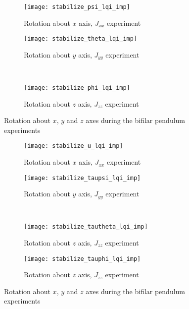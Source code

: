 \begin{appendices}
\begin{figure}[H]
\begin{subfigure}{.5\linewidth}
\centering
\texttt{[image: stabilize\_psi\_lqi\_imp]}
\caption{Rotation about $x$ axis, $J_{xx}$ experiment}
\label{fig:stabilize_psi_lqi_imp}
\end{subfigure}%
\begin{subfigure}{.5\linewidth}
\centering
\texttt{[image: stabilize\_theta\_lqi\_imp]}
\caption{Rotation about $y$ axis, $J_{yy}$ experiment}
\label{fig:stabilize_theta_lqi_imp}
\end{subfigure}\\[1ex]
\begin{subfigure}{\linewidth}
\centering
\texttt{[image: stabilize\_phi\_lqi\_imp]}
\caption{Rotation about $z$ axis, $J_{zz}$ experiment}
\label{fig:stabilize_psi_lqi_imp}
\end{subfigure}
\caption{Rotation about $x$, $y$ and $z$ axes during the bifilar pendulum experiments}
\label{fig:stabilize_lqi_imp}
\end{figure}

\begin{figure}[H]
\begin{subfigure}{.5\linewidth}
\centering
\texttt{[image: stabilize\_u\_lqi\_imp]}
\caption{Rotation about $x$ axis, $J_{xx}$ experiment}
\label{fig:stabilize_u_lqi_imp}
\end{subfigure}%
\begin{subfigure}{.5\linewidth}
\centering
\texttt{[image: stabilize\_taupsi\_lqi\_imp]}
\caption{Rotation about $y$ axis, $J_{yy}$ experiment}
\label{fig:stabilize_taupsi_lqi_imp}
\end{subfigure}\\[1ex]
\begin{subfigure}{0.5\linewidth}
\centering
\texttt{[image: stabilize\_tautheta\_lqi\_imp]}
\caption{Rotation about $z$ axis, $J_{zz}$ experiment}
\label{fig:stabilize_tautheta_lqi_imp}
\end{subfigure}
\begin{subfigure}{0.5\linewidth}
\centering
\texttt{[image: stabilize\_tauphi\_lqi\_imp]}
\caption{Rotation about $z$ axis, $J_{zz}$ experiment}
\label{fig:stabilize_tauphi_lqi_imp}
\end{subfigure}
\caption{Rotation about $x$, $y$ and $z$ axes during the bifilar pendulum experiments}
\label{fig:stabilize_control_lqi}
\end{figure}


\end{appendices}
